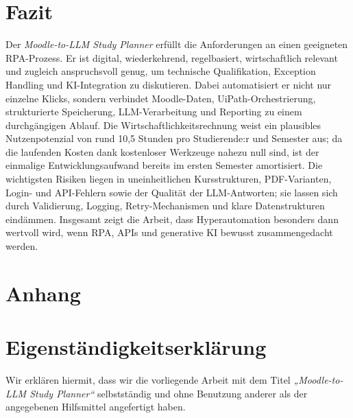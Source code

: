 \documentclass[11pt]{scrartcl}
\begin{document}
\section{Fazit}
Der \textit{Moodle-to-LLM Study Planner} erfüllt die Anforderungen an einen geeigneten RPA-Prozess. Er ist digital, wiederkehrend, regelbasiert, wirtschaftlich relevant und zugleich anspruchsvoll genug, um technische Qualifikation, Exception Handling und KI-Integration zu diskutieren. Dabei automatisiert er nicht nur einzelne Klicks, sondern verbindet Moodle-Daten, UiPath-Orchestrierung, strukturierte Speicherung, LLM-Verarbeitung und Reporting zu einem durchgängigen Ablauf. Die Wirtschaftlichkeitsrechnung weist ein plausibles Nutzenpotenzial von rund 10,5 Stunden pro Studierende:r und Semester aus; da die laufenden Kosten dank kostenloser Werkzeuge nahezu null sind, ist der einmalige Entwicklungsaufwand bereits im ersten Semester amortisiert. Die wichtigsten Risiken liegen in uneinheitlichen Kursstrukturen, PDF-Varianten, Login- und API-Fehlern sowie der Qualität der LLM-Antworten; sie lassen sich durch Validierung, Logging, Retry-Mechanismen und klare Datenstrukturen eindämmen. Insgesamt zeigt die Arbeit, dass Hyperautomation besonders dann wertvoll wird, wenn RPA, APIs und generative KI bewusst zusammengedacht werden.

\newpage
\section*{Anhang}

\listoffigures

\section*{Eigenständigkeitserklärung}

Wir erklären hiermit, dass wir die vorliegende Arbeit mit dem Titel
\emph{„Moodle-to-LLM Study Planner“} selbstständig und ohne Benutzung anderer als der angegebenen Hilfsmittel angefertigt haben.
\end{document}
